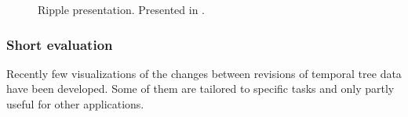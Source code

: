 \begin{figure}[tb]
\caption{\label{fig:ripple} Ripple presentation. Presented in \cite{ishihara2006ripple}.}
\end{figure}

\subsubsection{Short evaluation}
Recently few visualizations of the changes between revisions of temporal tree data have been developed. Some of them are tailored to specific tasks and only partly useful for other applications. 

